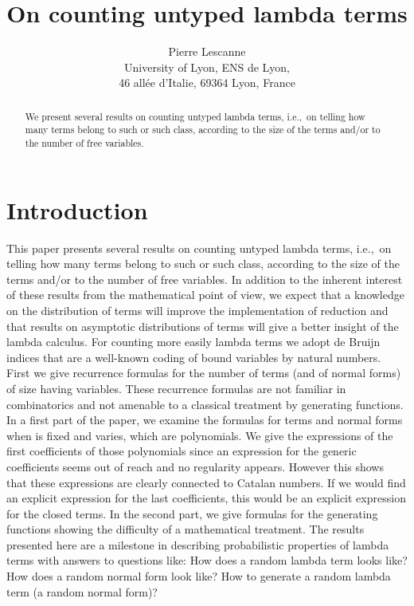\documentclass[preprint,authoryear]{elsarticle}
\title{On counting untyped lambda terms}
\author{Pierre Lescanne\\
University of Lyon, ENS de Lyon, \\
46 all\'ee d'Italie, 69364 Lyon, France}
\newcommand{\ie}{i.e.,~}
\begin{document}
\ifElsev \else 
\date{}
\maketitle 
\pagestyle{plain}
\thispagestyle{empty}
 \fi

 \begin{abstract}
   We present several results on counting untyped lambda terms, \ie on telling
   how many terms belong to such or such class, according to the
   size of the terms and/or to the number of free variables.  
 \end{abstract}

\section{Introduction}
\label{sec:introduction}

This paper presents several results on counting untyped lambda terms, \ie on telling how
many terms belong to such or such class, according to the size of the terms and/or to the
number of free variables.  In addition to the inherent interest of these results from the
mathematical point of view, we expect that a knowledge on the distribution of terms will
improve the implementation of reduction and that results on asymptotic distributions of
terms will give a better insight of the lambda calculus.  For counting more easily lambda
terms we adopt de Bruijn indices that are a well-known coding of bound variables by
natural numbers.  First we give recurrence formulas for the number of terms (and of normal
forms) of size  having  variables.  These recurrence formulas are not familiar in
combinatorics and not amenable to a classical treatment by generating functions.  In a
first part of the paper, we examine the formulas for terms and normal forms when  is
fixed and  varies, which are polynomials. We give the expressions of the first
coefficients of those polynomials since an expression for the generic coefficients seems
out of reach and no regularity appears.  However this shows that these expressions are
clearly connected to Catalan numbers. If we would find an explicit expression for the
last coefficients, this would be an explicit expression for the closed terms.  In the
second part, we give formulas for the generating functions showing the difficulty of a
mathematical treatment.  The results presented here are a milestone in describing
probabilistic properties of lambda terms with answers to questions like: How does a random
lambda term looks like? How does a random normal form look like?  How to generate a random
lambda term (a random normal form)?
\end{document}
